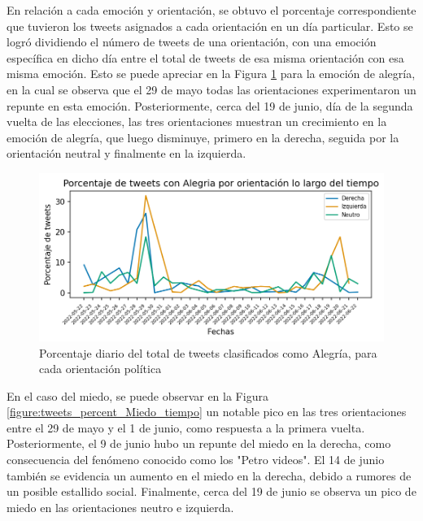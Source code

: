 En relación a cada emoción y orientación, se obtuvo el porcentaje correspondiente que tuvieron los tweets asignados a cada orientación en un día particular. Esto se logró dividiendo el número de tweets de una orientación, con una emoción específica en dicho día entre el total de tweets de esa misma orientación con esa misma emoción. Esto se puede apreciar en la Figura \ref{figure:tweets_percent_alegria_tiempo} para la emoción de alegría, en la cual se observa que el 29 de mayo todas las orientaciones  experimentaron un repunte en esta emoción. Posteriormente, cerca del 19 de junio, día de la segunda vuelta de las elecciones, las tres orientaciones muestran un crecimiento en la emoción de alegría, que luego disminuye, primero en la derecha, seguida por la orientación neutral y finalmente en la izquierda.




\begin{figure}[!htbp]
	\centering
	\includegraphics{Images & Logos/Results/Porcentaje de tweets con Alegria por sector lo largo del tiempo.png} 
	\caption{Porcentaje diario del total de tweets clasificados como Alegría, para cada orientación política}
	\label{figure:tweets_percent_alegria_tiempo}
\end{figure}


En el caso del miedo, se puede observar en la Figura \ref{figure:tweets_percent_Miedo_tiempo} un notable pico en las tres orientaciones entre el 29 de mayo y el 1 de junio, como respuesta a la primera vuelta. Posteriormente, el 9 de junio hubo un repunte del miedo en la derecha, como consecuencia del fenómeno conocido como los "Petro videos". El 14 de junio también se evidencia un aumento en el miedo en la derecha, debido a rumores de un posible estallido social. Finalmente, cerca del 19 de junio se observa un pico de miedo en las orientaciones neutro e izquierda.


